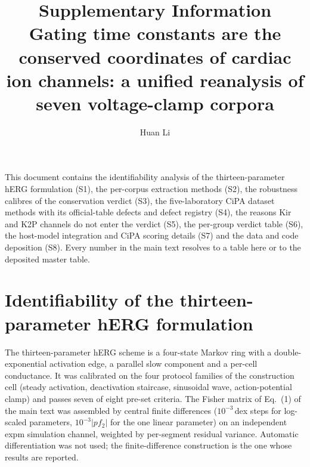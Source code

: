 \documentclass[11pt,a4paper]{article}
\title{\bfseries Supplementary Information\\[4pt]
\large Gating time constants are the conserved coordinates of cardiac ion
channels: a unified reanalysis of seven voltage-clamp corpora}
\author{Huan Li}
\date{}
\begin{document}
\maketitle

\noindent This document contains the identifiability analysis of the
thirteen-parameter hERG formulation (S1), the per-corpus extraction methods
(S2), the robustness calibres of the conservation verdict (S3), the
five-laboratory CiPA dataset methods with its official-table defects and defect
registry (S4), the reasons Kir and K2P channels do not enter the verdict (S5),
the per-group verdict table (S6), the host-model integration and CiPA scoring
details (S7) and the data and code deposition (S8). Every number in the main
text resolves to a table here or to the deposited master table.

\tableofcontents
\newpage

\section{Identifiability of the thirteen-parameter hERG formulation}

The thirteen-parameter hERG scheme is a four-state Markov ring with a
double-exponential activation edge, a parallel slow component and a per-cell
conductance. It was calibrated on the four protocol families of the
construction cell (steady activation, deactivation staircase, sinusoidal wave,
action-potential clamp) and passes seven of eight pre-set criteria. The Fisher
matrix of Eq.~(1) of the main text was assembled by central finite differences
($10^{-3}$\,dex steps for log-scaled parameters, $10^{-3}|pf_2|$ for the one
linear parameter) on an independent expm simulation channel, weighted by
per-segment residual variance. Automatic differentiation was not used; the
finite-difference construction is the one whose results are reported.
\end{document}
